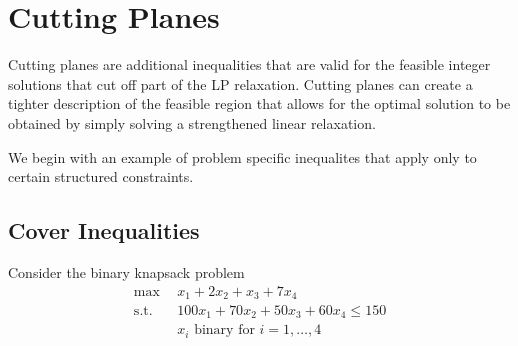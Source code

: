 %
%
%

%
%
%
%
%
%
%
%
%





\section{Cutting Planes}
Cutting planes are additional inequalities that are valid for the feasible integer solutions that  cut off part of the LP relaxation.  Cutting planes can create a tighter description of the feasible region that allows for the optimal solution to be obtained by simply solving a strengthened linear relaxation. 

We begin with an example of problem specific inequalites that apply only to certain structured constraints.

\subsection{Cover Inequalities}
Consider the binary knapsack problem
\begin{align*}
\max \ \ & x_1 + 2x_2 + x_3 + 7 x_4\\
\text{s.t.} \ \ & 100 x_1 + 70x_2 + 50 x_3 + 60 x_4 \leq 150\\
& x_i  \text{ binary  for } i =1, \dots, 4
\end{align*}

